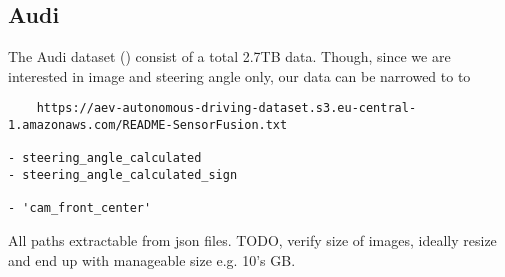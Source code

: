 \subsection{Audi}
The Audi dataset (\cite{geyer2020a2d2}) consist of a total 2.7TB data. Though, since we are interested in image and steering angle only, our data can be narrowed to to 
\begin{verbatim}
    https://aev-autonomous-driving-dataset.s3.eu-central-1.amazonaws.com/README-SensorFusion.txt
    
- steering_angle_calculated
- steering_angle_calculated_sign

- 'cam_front_center'
\end{verbatim}

All paths extractable from json files. TODO, verify size of images, ideally resize and end up with manageable size e.g. 10's GB.
